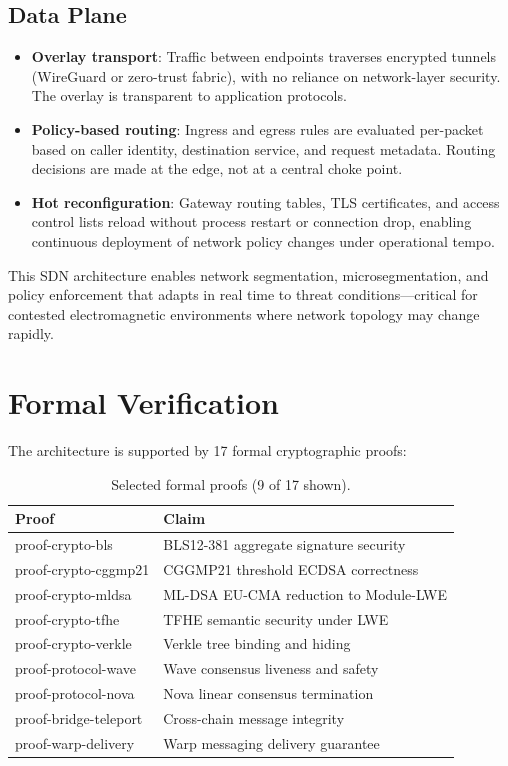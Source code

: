 \documentclass[11pt,letterpaper]{article}
\begin{document}
\subsection{Data Plane}

\begin{itemize}
\item \textbf{Overlay transport}: Traffic between endpoints traverses encrypted tunnels (WireGuard or zero-trust fabric), with no reliance on network-layer security. The overlay is transparent to application protocols.
\item \textbf{Policy-based routing}: Ingress and egress rules are evaluated per-packet based on caller identity, destination service, and request metadata. Routing decisions are made at the edge, not at a central choke point.
\item \textbf{Hot reconfiguration}: Gateway routing tables, TLS certificates, and access control lists reload without process restart or connection drop, enabling continuous deployment of network policy changes under operational tempo.
\end{itemize}

This SDN architecture enables network segmentation, microsegmentation, and policy enforcement that adapts in real time to threat conditions---critical for contested electromagnetic environments where network topology may change rapidly.

\section{Formal Verification}

The architecture is supported by 17 formal cryptographic proofs:

\begin{table}[H]
\centering
\small
\begin{tabular}{@{}lp{7cm}@{}}
\toprule
\textbf{Proof} & \textbf{Claim} \\
\midrule
proof-crypto-bls & BLS12-381 aggregate signature security \\
proof-crypto-cggmp21 & CGGMP21 threshold ECDSA correctness \\
proof-crypto-mldsa & ML-DSA EU-CMA reduction to Module-LWE \\
proof-crypto-tfhe & TFHE semantic security under LWE \\
proof-crypto-verkle & Verkle tree binding and hiding \\
proof-protocol-wave & Wave consensus liveness and safety \\
proof-protocol-nova & Nova linear consensus termination \\
proof-bridge-teleport & Cross-chain message integrity \\
proof-warp-delivery & Warp messaging delivery guarantee \\
\bottomrule
\end{tabular}
\caption{Selected formal proofs (9 of 17 shown).}
\label{tab:proofs}
\end{table}
\end{document}

